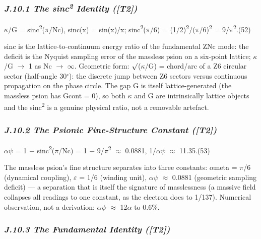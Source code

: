 \documentclass[11pt,letterpaper]{article}
\begin{document}
\subsubsection*{\itshape J.10.1  The sinc\textsuperscript{2} Identity ([T2])}

\begingroup\centering $\kappa$/G = sinc\textsuperscript{2}($\pi$/Nc),   sinc(x) = sin(x)/x;   sinc\textsuperscript{2}($\pi$/6) = (1/2)\textsuperscript{2}/($\pi$/6)\textsuperscript{2} = 9/$\pi$\textsuperscript{2}.\hspace{2em}(52)\par\endgroup

\noindent sinc is the lattice-to-continuum energy ratio of the fundamental ZNc mode: the deficit is the Nyquist sampling error of the massless psion on a six-point lattice; $\kappa$/G $\to$ 1 as Nc $\to$ $\infty$. Geometric form: $\surd$($\kappa$/G) = chord/arc of a Z6 circular sector (half-angle 30$^{\circ}$): the discrete jump between Z6 sectors versus continuous propagation on the phase circle. The gap G is itself lattice-generated (the massless psion has Gcont = 0), so both $\kappa$ and G are intrinsically lattice objects and the sinc\textsuperscript{2} is a genuine physical ratio, not a removable artefact.

\subsubsection*{\itshape J.10.2  The Psionic Fine-Structure Constant ([T2])}

\begingroup\centering $\alpha$$\psi$ = 1 $-$ sinc\textsuperscript{2}($\pi$/Nc) = 1 $-$ 9/$\pi$\textsuperscript{2} $\approx$ 0.0881,   1/$\alpha$$\psi$ $\approx$ 11.35.\hspace{2em}(53)\par\endgroup

\noindent The massless psion's fine structure separates into three constants: $\alpha$meta = $\pi$/6 (dynamical coupling), $\varepsilon$ = 1/6 (winding unit), $\alpha$$\psi$ $\approx$ 0.0881 (geometric sampling deficit) --- a separation that is itself the signature of masslessness (a massive field collapses all readings to one constant, as the electron does to 1/137). Numerical observation, not a derivation: $\alpha$$\psi$ $\approx$ 12$\alpha$ to 0.6\%.

\subsubsection*{\itshape J.10.3  The Fundamental Identity ([T2])}
\end{document}
